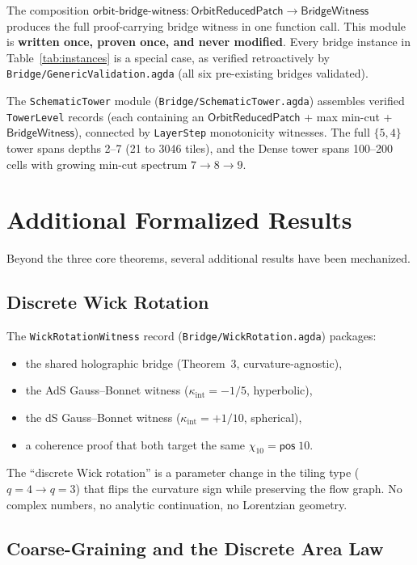 \documentclass[11pt, a4paper]{article}
\theoremstyle{plain}
\theoremstyle{definition}
\newcommand{\BW}{\mathsf{BridgeWitness}}
\newcommand{\ORP}{\mathsf{OrbitReducedPatch}}
\begin{document}
The composition
$\mathsf{orbit\text{-}bridge\text{-}witness} :
\ORP \to \BW$
produces the full proof-carrying bridge witness in one function
call.  This module is \textbf{written once, proven once, and never
modified}.  Every bridge instance in Table~\ref{tab:instances} is a
special case, as verified retroactively by
\texttt{Bridge/GenericValidation.agda} (all six pre-existing bridges
validated).

The \texttt{SchematicTower} module
(\texttt{Bridge/SchematicTower.agda}) assembles verified
\texttt{TowerLevel} records (each containing an $\ORP$ + max
min-cut + $\BW$), connected by \texttt{LayerStep}
monotonicity witnesses.  The full $\{5,4\}$ tower spans depths
2--7 (21 to 3046 tiles), and the Dense tower spans 100--200 cells
with growing min-cut spectrum $7 \to 8 \to 9$.

\section{Additional Formalized Results}
\label{sec:additional}

Beyond the three core theorems, several additional results have
been mechanized.

\subsection{Discrete Wick Rotation}

The \texttt{WickRotationWitness} record
(\texttt{Bridge/WickRotation.agda}) packages:
\begin{itemize}[nosep]
  \item the shared holographic bridge (Theorem~3, curvature-agnostic),
  \item the AdS Gauss--Bonnet witness ($\kappa_{\mathrm{int}} = -1/5$,
    hyperbolic),
  \item the dS Gauss--Bonnet witness ($\kappa_{\mathrm{int}} = +1/10$,
    spherical),
  \item a coherence proof that both target the same
    $\chi_{10} = \mathsf{pos}\;10$.
\end{itemize}
The ``discrete Wick rotation'' is a parameter change in the tiling
type ($q = 4 \to q = 3$) that flips the curvature sign while
preserving the flow graph.  No complex numbers, no analytic
continuation, no Lorentzian geometry.

\subsection{Coarse-Graining and the Discrete Area Law}
\end{document}
